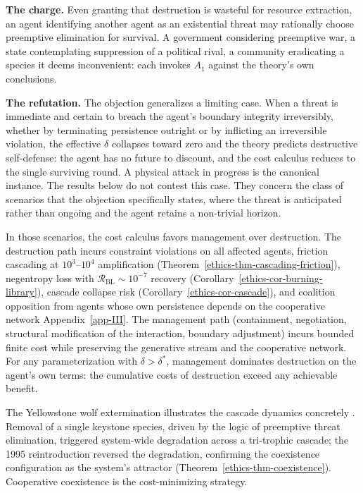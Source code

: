 \documentclass[11pt]{article}
\theoremstyle{plain}
\theoremstyle{definition}
\theoremstyle{remark}
\begin{document}
\textbf{The charge.} Even granting that destruction is wasteful for
resource extraction, an agent identifying another agent as an
existential threat may rationally choose preemptive elimination for
survival. A government considering preemptive war, a state contemplating
suppression of a political rival, a community eradicating a species it
deems inconvenient: each invokes \(A_1\) against the theory's own
conclusions.

\textbf{The refutation.} The objection generalizes a limiting case. When
a threat is immediate and certain to breach the agent's boundary
integrity irreversibly, whether by terminating persistence outright or
by inflicting an irreversible violation, the effective \(\delta\)
collapses toward zero and the theory predicts destructive self-defense:
the agent has no future to discount, and the cost calculus reduces to
the single surviving round. A physical attack in progress is the
canonical instance. The results below do not contest this case. They
concern the class of scenarios that the objection specifically states,
where the threat is anticipated rather than ongoing and the agent
retains a non-trivial horizon.

In those scenarios, the cost calculus favors management over
destruction. The destruction path incurs constraint violations on all
affected agents, friction cascading at \(10^3\)--\(10^4\) amplification
(Theorem~\ref{ethics-thm-cascading-friction}), negentropy loss with
\(\mathcal{R}_{\text{BL}} \sim 10^{-7}\) recovery
(Corollary~\ref{ethics-cor-burning-library}), cascade collapse risk
(Corollary~\ref{ethics-cor-cascade}), and coalition opposition from
agents whose own persistence depends on the cooperative network
Appendix~\ref{app-III}. The management path (containment, negotiation,
structural modification of the interaction, boundary adjustment) incurs
bounded finite cost while preserving the generative stream and the
cooperative network. For any parameterization with
\(\delta > \delta^*\), management dominates destruction on the agent's
own terms: the cumulative costs of destruction exceed any achievable
benefit.

The Yellowstone wolf extermination illustrates the cascade dynamics
concretely \citep{SmithDW2003, RippleBeschta2012}. Removal of a single
keystone species, driven by the logic of preemptive threat elimination,
triggered system-wide degradation across a tri-trophic cascade; the 1995
reintroduction reversed the degradation, confirming the coexistence
configuration as the system's attractor
(Theorem~\ref{ethics-thm-coexistence}). Cooperative coexistence is the
cost-minimizing strategy.
\end{document}
